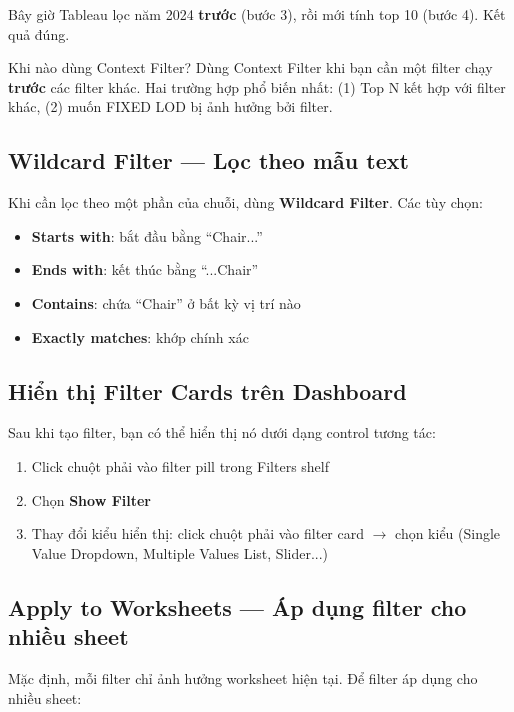 \documentclass[12pt]{article}
\begin{document}
\noindent Bây giờ Tableau lọc năm 2024 \textbf{trước} (bước 3), rồi mới tính top 10 (bước 4). Kết quả đúng.

\begin{guidelinebox}{Khi nào dùng Context Filter?}
Dùng Context Filter khi bạn cần một filter chạy \textbf{trước} các filter khác. Hai trường hợp phổ biến nhất: (1) Top N kết hợp với filter khác, (2) muốn FIXED LOD bị ảnh hưởng bởi filter.
\end{guidelinebox}

\subsection{Wildcard Filter --- Lọc theo mẫu text}

\noindent Khi cần lọc theo một phần của chuỗi, dùng \textbf{Wildcard Filter}. Các tùy chọn:
\begin{itemize}[nosep]
    \item \textbf{Starts with}: bắt đầu bằng ``Chair...''
    \item \textbf{Ends with}: kết thúc bằng ``...Chair''
    \item \textbf{Contains}: chứa ``Chair'' ở bất kỳ vị trí nào
    \item \textbf{Exactly matches}: khớp chính xác
\end{itemize}

\subsection{Hiển thị Filter Cards trên Dashboard}

\noindent Sau khi tạo filter, bạn có thể hiển thị nó dưới dạng control tương tác:

\begin{enumerate}[nosep]
    \item Click chuột phải vào filter pill trong Filters shelf
    \item Chọn \textbf{Show Filter}
    \item Thay đổi kiểu hiển thị: click chuột phải vào filter card $\rightarrow$ chọn kiểu (Single Value Dropdown, Multiple Values List, Slider...)
\end{enumerate}

\subsection{Apply to Worksheets --- Áp dụng filter cho nhiều sheet}

\noindent Mặc định, mỗi filter chỉ ảnh hưởng worksheet hiện tại. Để filter áp dụng cho nhiều sheet:
\end{document}
